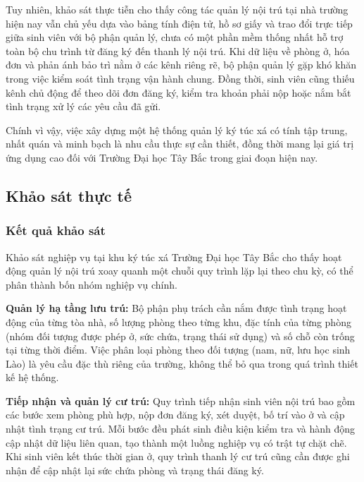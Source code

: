 \documentclass[13pt,a4paper]{extarticle}
\numberwithin{figure}{section}
\numberwithin{table}{section}
\begin{document}
	Tuy nhiên, khảo sát thực tiễn cho thấy công tác quản lý nội trú tại nhà trường hiện nay vẫn chủ yếu dựa vào bảng tính điện tử, hồ sơ giấy và trao đổi trực tiếp giữa sinh viên với bộ phận quản lý, chưa có một phần mềm thống nhất hỗ trợ toàn bộ chu trình từ đăng ký đến thanh lý nội trú. Khi dữ liệu về phòng ở, hóa đơn và phản ánh bảo trì nằm ở các kênh riêng rẽ, bộ phận quản lý gặp khó khăn trong việc kiểm soát tình trạng vận hành chung. Đồng thời, sinh viên cũng thiếu kênh chủ động để theo dõi đơn đăng ký, kiểm tra khoản phải nộp hoặc nắm bắt tình trạng xử lý các yêu cầu đã gửi.
	
	Chính vì vậy, việc xây dựng một hệ thống quản lý ký túc xá có tính tập trung, nhất quán và minh bạch là nhu cầu thực sự cần thiết, đồng thời mang lại giá trị ứng dụng cao đối với Trường Đại học Tây Bắc trong giai đoạn hiện nay.
	
	\subsection{Khảo sát thực tế}
	
	\subsubsection{Kết quả khảo sát}
	
	Khảo sát nghiệp vụ tại khu ký túc xá Trường Đại học Tây Bắc cho thấy hoạt động quản lý nội trú xoay quanh một chuỗi quy trình lặp lại theo chu kỳ, có thể phân thành bốn nhóm nghiệp vụ chính.
	
	\textbf{Quản lý hạ tầng lưu trú:} Bộ phận phụ trách cần nắm được tình trạng hoạt động của từng tòa nhà, số lượng phòng theo từng khu, đặc tính của từng phòng (nhóm đối tượng được phép ở, sức chứa, trạng thái sử dụng) và số chỗ còn trống tại từng thời điểm. Việc phân loại phòng theo đối tượng (nam, nữ, lưu học sinh Lào) là yêu cầu đặc thù riêng của trường, không thể bỏ qua trong quá trình thiết kế hệ thống.
	
	\textbf{Tiếp nhận và quản lý cư trú:} Quy trình tiếp nhận sinh viên nội trú bao gồm các bước xem phòng phù hợp, nộp đơn đăng ký, xét duyệt, bố trí vào ở và cập nhật tình trạng cư trú. Mỗi bước đều phát sinh điều kiện kiểm tra và hành động cập nhật dữ liệu liên quan, tạo thành một luồng nghiệp vụ có trật tự chặt chẽ. Khi sinh viên kết thúc thời gian ở, quy trình thanh lý cư trú cũng cần được ghi nhận để cập nhật lại sức chứa phòng và trạng thái đăng ký.
	
\end{document}
